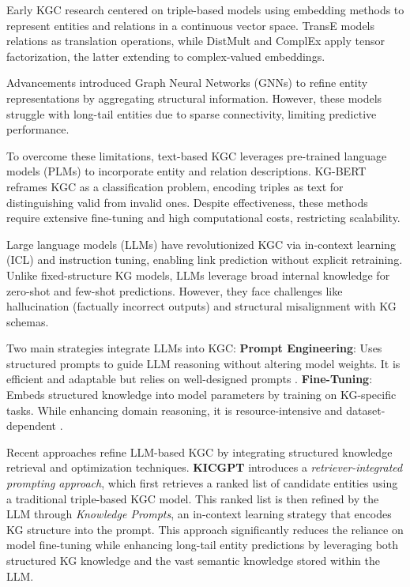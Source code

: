 \documentclass[12pt,a4paper]{article}
\begin{document}
Early KGC research centered on triple-based models using embedding methods to represent entities and relations in a continuous vector space. TransE \cite{bordes2013translating} models relations as translation operations, while DistMult \cite{yang2014embedding} and ComplEx \cite{trouillon2016complex} apply tensor factorization, the latter extending to complex-valued embeddings.

Advancements introduced Graph Neural Networks (GNNs) \cite{schlichtkrull2018modeling} to refine entity representations by aggregating structural information. However, these models struggle with long-tail entities due to sparse connectivity, limiting predictive performance.

To overcome these limitations, text-based KGC leverages pre-trained language models (PLMs) to incorporate entity and relation descriptions. KG-BERT \cite{yao2019kgbert} reframes KGC as a classification problem, encoding triples as text for distinguishing valid from invalid ones. Despite effectiveness, these methods require extensive fine-tuning and high computational costs, restricting scalability.

Large language models (LLMs) have revolutionized KGC via in-context learning (ICL) and instruction tuning, enabling link prediction without explicit retraining. Unlike fixed-structure KG models, LLMs leverage broad internal knowledge for zero-shot and few-shot predictions. However, they face challenges like hallucination (factually incorrect outputs) and structural misalignment with KG schemas.

Two main strategies integrate LLMs into KGC: \textbf{Prompt Engineering}: Uses structured prompts to guide LLM reasoning without altering model weights. It is efficient and adaptable but relies on well-designed prompts \cite{liu2021pretrain}. \textbf{Fine-Tuning}: Embeds structured knowledge into model parameters by training on KG-specific tasks. While enhancing domain reasoning, it is resource-intensive and dataset-dependent \cite{raffel2020exploring}.

Recent approaches refine LLM-based KGC by integrating structured knowledge retrieval and optimization techniques. \textbf{KICGPT} \cite{shi2023kicgpt} introduces a \textit{retriever-integrated prompting approach}, which first retrieves a ranked list of candidate entities using a traditional triple-based KGC model. This ranked list is then refined by the LLM through \textit{Knowledge Prompts}, an in-context learning strategy that encodes KG structure into the prompt. This approach significantly reduces the reliance on model fine-tuning while enhancing long-tail entity predictions by leveraging both structured KG knowledge and the vast semantic knowledge stored within the LLM.
\end{document}
